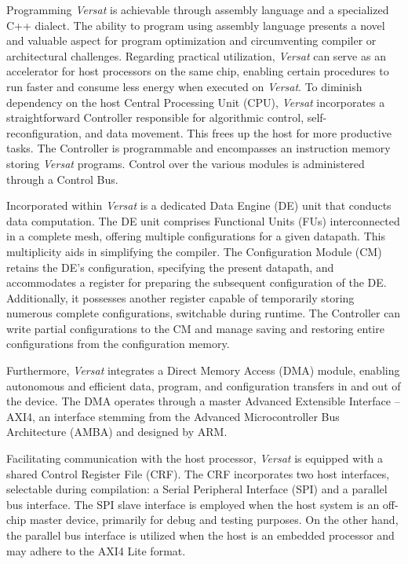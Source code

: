 Programming \textit{Versat} is achievable through assembly language and a specialized C++ dialect. The ability to program using assembly language presents a novel and valuable aspect for program optimization and circumventing compiler or architectural challenges.
Regarding practical utilization, \textit{Versat} can serve as an accelerator for host processors on the same chip, enabling certain procedures to run faster and consume less energy when executed on \textit{Versat}. To diminish dependency on the host Central Processing Unit (CPU), \textit{Versat} incorporates a straightforward Controller responsible for algorithmic control, self-reconfiguration, and data movement. This frees up the host for more productive tasks. The Controller is programmable and encompasses an instruction memory storing \textit{Versat} programs. Control over the various modules is administered through a Control Bus.

Incorporated within \textit{Versat} is a dedicated Data Engine (DE) unit that conducts data computation. The DE unit comprises Functional Units (FUs) interconnected in a complete mesh, offering multiple configurations for a given datapath. This multiplicity aids in simplifying the compiler.
The Configuration Module (CM) retains the DE's configuration, specifying the present datapath, and accommodates a register for preparing the subsequent configuration of the DE. Additionally, it possesses another register capable of temporarily storing numerous complete configurations, switchable during runtime. The Controller can write partial configurations to the CM and manage saving and restoring entire configurations from the configuration memory.

Furthermore, \textit{Versat} integrates a Direct Memory Access (DMA) module, enabling autonomous and efficient data, program, and configuration transfers in and out of the device. The DMA operates through a master Advanced Extensible Interface – AXI4, an interface stemming from the Advanced Microcontroller Bus Architecture (AMBA) and designed by ARM.

Facilitating communication with the host processor, \textit{Versat} is equipped with a shared Control Register File (CRF). The CRF incorporates two host interfaces, selectable during compilation: a Serial Peripheral Interface (SPI) and a parallel bus interface. The SPI slave interface is employed when the host system is an off-chip master device, primarily for debug and testing purposes. On the other hand, the parallel bus interface is utilized when the host is an embedded processor and may adhere to the AXI4 Lite format.

